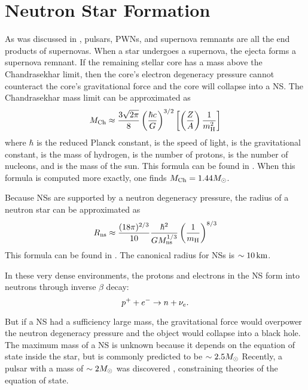 \section{Neutron Star Formation}

As was discussed in , pulsars, 
\acp{PWN},
and supernova remnants are all the end products of supernovas.  When a
star undergoes a supernova, the ejecta forms a supernova remnant.  If the
remaining stellar core has a mass above the Chandrasekhar limit,
then the core's electron degeneracy pressure cannot counteract the core's
gravitational force and the core will collapse into a \ac{NS}.
The Chandrasekhar mass limit can be
approximated as \citep{chandrasekhar_1931_maximum-ideal}
\begin{equation}
  M_\text{Ch} \approx 
  \frac{3\sqrt{2\pi}}{8}
  \left(\frac{\hbar c}{G}\right)^{3/2}
  \left[
  \left(\frac{Z}{A}\right)
  \frac{1}{m_\text{H}^2}
  \right]
\end{equation}
where $\hbar$ is the reduced Planck constant, \speedoflight is the
speed of light, \gravitationalconstant is the gravitational constant,
\MassHydrogen is the mass of hydrogen, \NumberProtons is the
number of protons, \NumberNucleons is the number of nucleons, and
\solarmass is the mass of the sun.  This formula can be found in
\citep{carroll_2006_introduction-modern}.
When this formula is computed more exactly, 
one finds $M_\text{Ch} = 1.44 M_{\odot}$.

Because \acp{NS} are supported by a
neutron degeneracy pressure,
the radius of a neutron star can be approximated as
\begin{equation}
  R_\text{ns} \approx \frac{(18 \pi)^{2/3}}{10}
  \frac{\hbar^2}{G M_\text{ns}^{1/3}}
  \left(\frac{1}{m_\text{H}}\right)^{8/3}
\end{equation}
This formula can be found in \citep{carroll_2006_introduction-modern}.
The canonical radius for \acp{NS} is $\sim 10\,\text{km}$.

In these very dense environments, the protons and electrons in the \ac{NS}
form into neutrons through inverse $\beta$ decay:
\begin{equation}
  p^+ + e^- 
  \rightarrow n + \nu_e.
\end{equation}

But if a \ac{NS} had a sufficiency large mass, the gravitational
force would overpower the neutron degeneracy pressure and the
object would collapse into a black hole. The maximum mass of a
\ac{NS} is unknown because it depends on the equation of state
inside the star, but is commonly predicted to be $\sim 2.5M_{\odot}$
Recently, a pulsar with a mass of $\sim 2M_{\odot}$ was discovered
\citep{demorest_2010_two-solar-mass-neutron}, constraining
theories of the equation of state.

